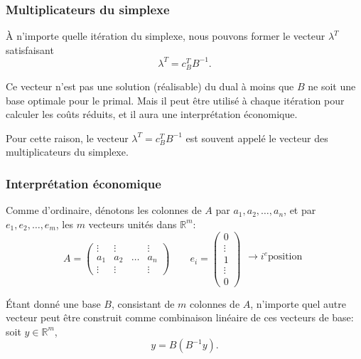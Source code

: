 \documentclass[usepdftitle=false]{beamer}
\def\RR{\mathbb{R}}
\begin{document}
\begin{frame}
	\frametitle{Multiplicateurs du simplexe}
	
	\`A n'importe quelle itération du simplexe, nous pouvons former le vecteur $\lambda^T$ satisfaisant
	\[
	\lambda^T = c_B^T B^{-1}.
	\]
	
	\mbox{}
	
	Ce vecteur n'est pas une solution (réalisable) du dual à moins que $B$ ne soit une base optimale pour le primal. Mais il peut être utilisé à chaque itération pour calculer les coûts réduits, et il aura une interprétation économique.
	
	\mbox{}
	
	Pour cette raison, le vecteur $\lambda^T = c_B^T B^{-1}$ est souvent appelé le vecteur des multiplicateurs du simplexe.
	
\end{frame}

\begin{frame}
	\frametitle{Interprétation économique}
	
	Comme d'ordinaire, dénotons les colonnes de $A$ par $a_1, a_2,\ldots, a_n$, et par $e_1, e_2,\ldots, e_m$, les $m$ vecteurs unités dans $\RR^m$:
	\[
	A = \begin{pmatrix}
		\vdots & \vdots & & \vdots \\
		a_1 & a_2 & \ldots & a_n \\
		\vdots & \vdots & & \vdots
	\end{pmatrix}
	\qquad
	e_i = \begin{pmatrix}
		0 \\
		\vdots \\
		1 \\
		\vdots \\
		0
	\end{pmatrix}
	\begin{matrix}
		\\
		\\
		\rightarrow i^e \mbox{position} \\
		\\
		\\
	\end{matrix}
	\]
	
	\mbox{}
	
	\'Etant donné une base $B$, consistant de $m$ colonnes de $A$, n'importe quel autre vecteur peut être construit comme combinaison linéaire de ces vecteurs de base: soit $y \in \RR^m$,
	\[
	y = B \left(B^{-1}y\right).
	\]
	
\end{frame}
\end{document}
